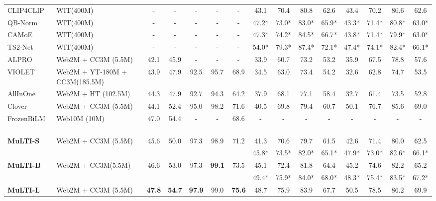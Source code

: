 \documentclass[10pt,twocolumn,letterpaper]{article}
\begin{document}
\begin{table*}[!]
{\begin{tabular}{ll|ccccc cccccccc}
                \midrule
CLIP4CLIP~\cite{Luo2021CLIP4ClipAE} & WIT(400M) & - & - & -  & -  & -  & 43.1 & 70.4 & 80.8 & 62.6 & 43.4 & 70.2 & 80.6 & 62.6 \\
    		QB-Norm~\cite{Bogolin2021CrossMR} & WIT(400M) & - & - & -  & -  & -  & 47.2* & 73.0* & 83.0* & 65.9* & 43.3* & 71.4* & 80.8* & 63.0* \\
    		CAMoE~\cite{Cheng2021ImprovingVR} & WIT(400M) & - & - & -  & -  & -  & 47.3* & 74.2* & 84.5* & 66.7* & 43.8* & 71.4* & 79.9* & 63.0* \\  
TS2-Net~\cite{Liu2022TS2NetTS} & WIT(400M) & - & - & -  & -  & -  & 54.0* & 79.3* & 87.4* & 72.1* & 47.4* & 74.1* & 82.4* & 66.1* \\
ALPRO~\cite{Li2021AlignAP} & Web2M + CC3M (5.5M) & 42.1 & 45.9 & -  & -  & -  & 33.9 & 60.7 & 73.2 & 53.2 & 35.9 & 67.5 & 78.8 & 57.6 \\
    		VIOLET~\cite{Fu2021VIOLETE} & Web2M + YT-180M + CC3M(185.5M) & 43.9 & 47.9 & 92.5 & 95.7 & 68.9 & 34.5 & 63.0 & 73.4 & 54.2 & 32.6 & 62.8 & 74.7 & 53.5\\
    		AllInOne~\cite{Wang2022AllIO} & Web2M + HT (102.5M) & 44.3 & 47.9 & 92.7 & 94.3 & 64.2 & 37.9 & 68.1 & 77.1  & 58.4  & 32.7 & 61.4 & 73.5 & 52.8  \\
    		Clover ~\cite{Huang2022CloverTA} & Web2M + CC3M (5.5M) & 44.1 & 52.4 & 95.0 & 98.2 & 71.6 & 40.5 & 69.8 & 79.4 & 60.7 & 50.1 & 76.7 & 85.6 & 69.0 \\
    		FrozenBiLM ~\cite{Yang2022ZeroShotVQ} & Web10M (10M) & 47.0 & 54.4 & -  & -  & 68.6  & - & -& - & -  & - & - & - & -  \\ 
    		\midrule 
    		\multirow{2}{*}{\textbf{MuLTI-S}} & \multirow{2}{*}{Web2M + CC3M (5.5M)} & \multirow{2}{*}{45.6} & \multirow{2}{*}{50.0} & \multirow{2}{*}{97.3} & \multirow{2}{*}{98.9}  & \multirow{2}{*}{71.2} & 41.3 & 70.6 & 79.7 & 61.5 & 42.6 & 71.4 & 80.0 & 62.5 \\
    		 & & & & & & & 45.8* & 73.5* & 82.0* & 65.1* & 47.9* & 73.0* & 82.6* & 66.1* \\ 
    		\midrule
    		\multirow{2}{*}{\textbf{MuLTI-B}} & \multirow{2}{*}{Web2M + CC3M(5.5M)} & \multirow{2}{*}{46.6} & \multirow{2}{*}{53.0} &  \multirow{2}{*}{97.3} & \multirow{2}{*}{\textbf{99.1}} & \multirow{2}{*}{73.5} & 45.1 & 72.4  & 81.8  & 64.4 & 45.2 & 74.6 & 82.2 & 65.2 \\
    		 & & & & & & & 49.4* & 75.9* & 84.0* & 68.0* & 48.3* & 75.4* & 83.5* & 67.2* \\ 
    		\midrule
    		\multirow{2}{*}{\textbf{MuLTI-L}} & \multirow{2}{*}{Web2M + CC3M (5.5M)} & \multirow{2}{*}{\textbf{47.8}} & \multirow{2}{*}{\textbf{54.7}} & \multirow{2}{*}{\textbf{97.9}} & \multirow{2}{*}{99.0} & \multirow{2}{*}{\textbf{75.6}} & 48.7 & 75.9 & 83.9 & 67.7  & 50.5 & 78.5 & 86.2 & 69.9 \\

\end{tabular}}
\end{table*}
\end{document}
